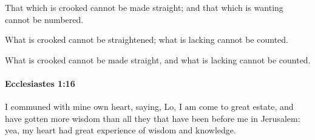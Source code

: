 			\begin{versebox}
					\item[BHS] 
					\item[LXX] 
					\item[ASV] That which is crooked cannot be made straight; and that which is wanting cannot be numbered.
					\item[NIV] What is crooked cannot be straightened; what is lacking cannot be counted.
					\item[NRSV] What is crooked cannot be made straight, and what is lacking cannot be counted.
			\end{versebox}

		\paragraph{Ecclesiastes 1:16} %
			\label{ECCLESIASTES-1-16}

			I communed with mine own heart, saying, Lo, I am come to great estate, and have gotten more wisdom than all they that have been before me in Jerusalem: yea, my heart had great experience of wisdom and knowledge.

